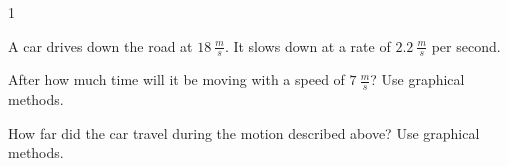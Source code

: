 
\AddToShipoutPicture*{\BackgroundPic}

\addtocounter {ProbNum} {1}

 
{\bf \Large{}} A car drives down the road at ${18~\tfrac{m}{s}}$.  It slows down at a rate of ${2.2~\tfrac{m}{s}}$ per second.  \bigskip

After how much time will it be moving with a speed of ${7~\tfrac{m}{s}}$? Use graphical methods.
\vfill

How far did the car travel during the motion described above? Use graphical methods.
 \vfill




\newpage